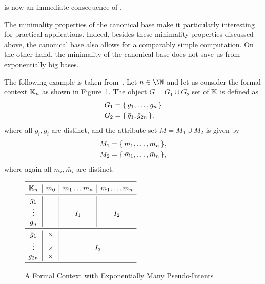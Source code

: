  is now an immediate consequence
of .

The minimality properties of the canonical base make it particularly interesting for
practical applications.  Indeed, besides these minimality properties discussed above, the
canonical base also allows for a comparably simple computation.  On the other hand, the
minimality of the canonical base does not save us from exponentially big bases.

\begin{Example}
  \label{expl:canonical-base-can-be-exponential}
  The following example is taken from~\cite{DBLP:journals/jucs/Kuznetsov04}.  Let $n \in
  \NN$ and let us consider the formal context ${\mathbb{K}}_n$ as shown in
  Figure~\ref{fig:expl-for-exponentially-many-pseudo-intents}.  The object $G = G_1 \cup
  G_2$ set of ${\mathbb{K}}$ is defined as
  \begin{align*}
    G_1 &= {\{\, g_1, \dots, g_n \,\}} \\
    G_2 &= {\{\, \bar g_1, \bar g_{2n} \,\}},
  \end{align*}
  where all $g_i, \bar g_i$ are distinct, and the attribute set $M = M_1 \cup M_2$ is
  given by
  \begin{align*}
    M_1 &= {\{\, m_1, \dots, m_n \,\}}, \\
    M_2 &= {\{\, \bar m_1, \dots, \bar m_n \,\}},
  \end{align*}
  where again all $m_i, \bar m_i$ are distinct.

  \begin{figure}[tp]
    \centering
    \begin{math}
      \begin{array}{c | c | c | c}
        \toprule
        \con K_n & m_0 & m_1 \dots m_n & \bar m_1, \dots \bar m_n \\
        \midrule
        g_1 & & & \\
        \vdots & & I_1 & I_2 \\
        g_n & & & \\
        \midrule
        \bar g_1   & \times & \multicolumn{2}{c}{} \\
        \vdots     & \times & \multicolumn{2}{c}{I_3} \\
        \bar g_{2n} & \times & \multicolumn{2}{c}{} \\
        \bottomrule
      \end{array}
    \end{math}
    \caption{A Formal Context with Exponentially Many Pseudo-Intents}
    \label{fig:expl-for-exponentially-many-pseudo-intents}
  \end{figure}


\end{Example}
